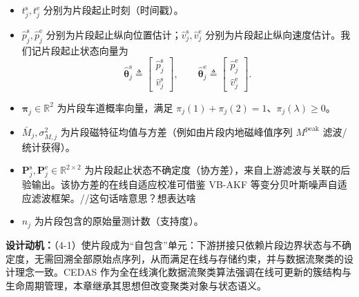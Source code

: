 \documentclass{xdupgthesis}
\begin{document}
\begin{itemize}
	\item $t_j^{\mathrm{s}},t_j^{\mathrm{e}}$ 分别为片段起止时刻（时间戳）。
	\item $\hat p_j^{\mathrm{s}},\hat p_j^{\mathrm{e}}$ 分别为片段起止纵向位置估计；$\hat v_j^{\mathrm{s}},\hat v_j^{\mathrm{e}}$ 分别为片段起止纵向速度估计。我们记片段起止状态向量为
	\[
	\hat{\boldsymbol{\theta}}_j^{\mathrm{s}} \triangleq
	\begin{bmatrix}\hat p_j^{\mathrm{s}}\\ \hat v_j^{\mathrm{s}}\end{bmatrix},\qquad
	\hat{\boldsymbol{\theta}}_j^{\mathrm{e}} \triangleq
	\begin{bmatrix}\hat p_j^{\mathrm{e}}\\ \hat v_j^{\mathrm{e}}\end{bmatrix}.
	\]
	\item $\boldsymbol{\pi}_j\in\mathbb{R}^2$ 为片段车道概率向量，满足 $\pi_j(1)+\pi_j(2)=1$、$\pi_j(\lambda)\ge 0$。
	\item $\bar M_j,\sigma_{M,j}^2$ 为片段磁特征均值与方差（例如由片段内地磁峰值序列 $M^{\mathrm{peak}}$ 滤波/统计获得）。
	\item $\mathbf{P}_j^{\mathrm{s}},\mathbf{P}_j^{\mathrm{e}}\in\mathbb{R}^{2\times2}$ 为片段起止状态不确定度（协方差），来自上游滤波与关联的后验输出。该协方差的在线自适应校准可借鉴 VB-AKF 等变分贝叶斯噪声自适应滤波框架。//这句话啥意思？想表达啥
	\item $n_j$ 为片段包含的原始量测计数（支持度）。
\end{itemize}

\vspace{0.3em}
\noindent\textbf{设计动机：}（4-1）使片段成为“自包含”单元：下游拼接只依赖片段边界状态与不确定度，无需回溯全部原始点序列，从而满足在线与存储约束，并与数据流聚类的设计理念一致。CEDAS 作为全在线演化数据流聚类算法强调在线可更新的簇结构与生命周期管理，本章继承其思想但改变聚类对象与状态语义。
\end{document}
